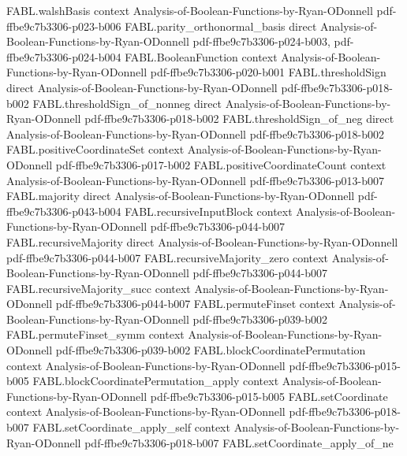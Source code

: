 \begin{theorem}
  {FABL.walshBasis}
  {context}
  {Analysis-of-Boolean-Functions-by-Ryan-ODonnell}
  {pdf-ffbe9c7b3306-p023-b006}
\proofstep
  {FABL.parity_orthonormal_basis}
  {direct}
  {Analysis-of-Boolean-Functions-by-Ryan-ODonnell}
  {pdf-ffbe9c7b3306-p024-b003,
    pdf-ffbe9c7b3306-p024-b004}
\proofstep
  {FABL.BooleanFunction}
  {context}
  {Analysis-of-Boolean-Functions-by-Ryan-ODonnell}
  {pdf-ffbe9c7b3306-p020-b001}
\proofstep
  {FABL.thresholdSign}
  {direct}
  {Analysis-of-Boolean-Functions-by-Ryan-ODonnell}
  {pdf-ffbe9c7b3306-p018-b002}
\proofstep
  {FABL.thresholdSign_of_nonneg}
  {direct}
  {Analysis-of-Boolean-Functions-by-Ryan-ODonnell}
  {pdf-ffbe9c7b3306-p018-b002}
\proofstep
  {FABL.thresholdSign_of_neg}
  {direct}
  {Analysis-of-Boolean-Functions-by-Ryan-ODonnell}
  {pdf-ffbe9c7b3306-p018-b002}
\proofstep
  {FABL.positiveCoordinateSet}
  {context}
  {Analysis-of-Boolean-Functions-by-Ryan-ODonnell}
  {pdf-ffbe9c7b3306-p017-b002}
\proofstep
  {FABL.positiveCoordinateCount}
  {context}
  {Analysis-of-Boolean-Functions-by-Ryan-ODonnell}
  {pdf-ffbe9c7b3306-p013-b007}
\proofstep
  {FABL.majority}
  {direct}
  {Analysis-of-Boolean-Functions-by-Ryan-ODonnell}
  {pdf-ffbe9c7b3306-p043-b004}
\proofstep
  {FABL.recursiveInputBlock}
  {context}
  {Analysis-of-Boolean-Functions-by-Ryan-ODonnell}
  {pdf-ffbe9c7b3306-p044-b007}
\proofstep
  {FABL.recursiveMajority}
  {direct}
  {Analysis-of-Boolean-Functions-by-Ryan-ODonnell}
  {pdf-ffbe9c7b3306-p044-b007}
\proofstep
  {FABL.recursiveMajority_zero}
  {context}
  {Analysis-of-Boolean-Functions-by-Ryan-ODonnell}
  {pdf-ffbe9c7b3306-p044-b007}
\proofstep
  {FABL.recursiveMajority_succ}
  {context}
  {Analysis-of-Boolean-Functions-by-Ryan-ODonnell}
  {pdf-ffbe9c7b3306-p044-b007}
\proofstep
  {FABL.permuteFinset}
  {context}
  {Analysis-of-Boolean-Functions-by-Ryan-ODonnell}
  {pdf-ffbe9c7b3306-p039-b002}
\proofstep
  {FABL.permuteFinset_symm}
  {context}
  {Analysis-of-Boolean-Functions-by-Ryan-ODonnell}
  {pdf-ffbe9c7b3306-p039-b002}
\proofstep
  {FABL.blockCoordinatePermutation}
  {context}
  {Analysis-of-Boolean-Functions-by-Ryan-ODonnell}
  {pdf-ffbe9c7b3306-p015-b005}
\proofstep
  {FABL.blockCoordinatePermutation_apply}
  {context}
  {Analysis-of-Boolean-Functions-by-Ryan-ODonnell}
  {pdf-ffbe9c7b3306-p015-b005}
\proofstep
  {FABL.setCoordinate}
  {context}
  {Analysis-of-Boolean-Functions-by-Ryan-ODonnell}
  {pdf-ffbe9c7b3306-p018-b007}
\proofstep
  {FABL.setCoordinate_apply_self}
  {context}
  {Analysis-of-Boolean-Functions-by-Ryan-ODonnell}
  {pdf-ffbe9c7b3306-p018-b007}
\proofstep
  {FABL.setCoordinate_apply_of_ne}

\end{theorem}

